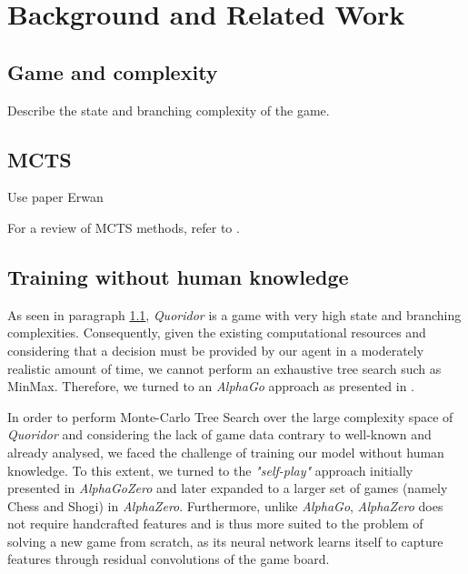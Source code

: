 \documentclass[journal, a4paper]{IEEEtran}
\begin{document}
\section{Background and Related Work}
\label{sec:background}

\subsection{Game and complexity}
\label{ssec:complexity}
Describe the state and branching complexity of the game.

\subsection{MCTS}
\label{ssec:mcts}
Use paper Erwan \cite{mc-rave}

For a review of MCTS methods, refer to \cite{mcts-review}.

\subsection{Training without human knowledge}
\label{ssec:human-knowledge}

As seen in paragraph \ref{ssec:complexity}, \textit{Quoridor} is a game with very high state and branching complexities. Consequently, given the existing computational resources and considering that a decision must be provided by our agent in a moderately realistic amount of time, we cannot perform an exhaustive tree search such as MinMax. Therefore, we turned to an \textit{AlphaGo} approach as presented in \cite{alphago}.

In order to perform Monte-Carlo Tree Search over the large complexity space of \textit{Quoridor} and considering the lack of game data contrary to well-known and already analysed, we faced the challenge of training our model without human knowledge. To this extent, we turned to the \textit{"self-play"} approach initially presented in  \textit{AlphaGoZero}\cite{alphagozero} and later expanded to a larger set of games (namely Chess and Shogi) in \textit{AlphaZero}\cite{alphazero}. Furthermore, unlike \textit{AlphaGo}, \textit{AlphaZero} does not require handcrafted features and is thus more suited to the problem of solving a new game from scratch, as its neural network learns itself to capture features through residual convolutions of the game board. 
\end{document}
